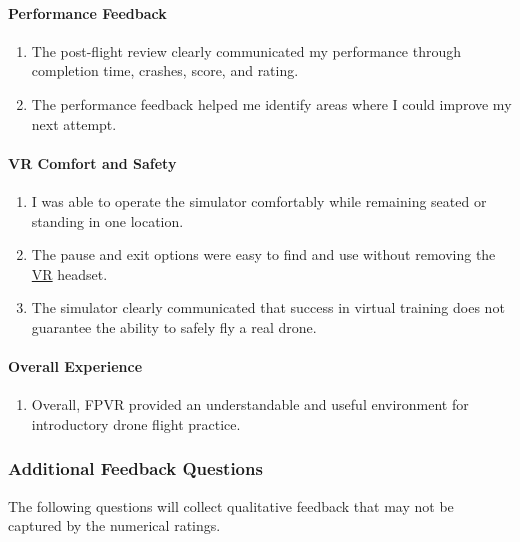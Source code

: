 \documentclass[12pt, titlepage]{article}
\begin{document}
\paragraph{Performance Feedback}

\begin{enumerate}
    \item[\textbf{Q12.}] The post-flight review clearly communicated my performance through completion time, crashes, score, and rating.

    \item[\textbf{Q13.}] The performance feedback helped me identify areas where I could improve my next attempt.
\end{enumerate}

\paragraph{VR Comfort and Safety}

\begin{enumerate}
    \item[\textbf{Q14.}] I was able to operate the simulator comfortably while remaining seated or standing in one location.

    \item[\textbf{Q15.}] The pause and exit options were easy to find and use without removing the \hyperlink{abbr:VR}{VR} headset.

    \item[\textbf{Q16.}] The simulator clearly communicated that success in virtual training does not guarantee the ability to safely fly a real drone.
\end{enumerate}

\paragraph{Overall Experience}

\begin{enumerate}
    \item[\textbf{Q17.}] Overall, FPVR provided an understandable and useful environment for introductory drone flight practice.
\end{enumerate}

\subsubsection{Additional Feedback Questions}

The following questions will collect qualitative feedback that may not be captured by the numerical ratings.
\end{document}
